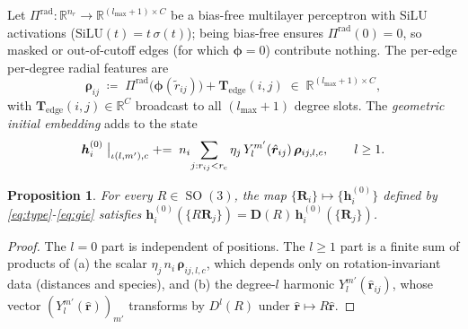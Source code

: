 \documentclass[11pt,a4paper]{article}
\DeclareMathOperator{\SO}{SO}
\newcommand{\R}{\mathbb{R}}
\newcommand{\bR}{\bm{R}}
\newcommand{\brh}{\hat{\bm{r}}}
\newcommand{\bh}{\bm{h}}
\newcommand{\Te}{\bm{T}}
\newcommand{\bD}{\bm{D}}
\newcommand{\bphi}{\bm{\phi}}
\newcommand{\brho}{\bm{\rho}}
\newcommand{\rcut}{r_{\mathrm{c}}}
\newcommand{\lmax}{l_{\max}}
\newcommand{\rtilde}{\widetilde{r}}
\theoremstyle{plain}
\newtheorem{proposition}[theorem]{Proposition}
\theoremstyle{definition}
\theoremstyle{remark}
\begin{document}
    Let $\Pi^{\mathrm{rad}}:\R^{n_r}\to\R^{(\lmax+1)\times C}$ be a bias-free
    multilayer perceptron with SiLU activations ($\mathrm{SiLU}(t)=t\,\sigma(t)$);
    being bias-free ensures $\Pi^{\mathrm{rad}}(0)=0$, so masked or out-of-cutoff
    edges (for which $\bphi=0$) contribute nothing. The per-edge per-degree radial
    features are
    \begin{equation}\label{eq:rho-edge}
        \brho_{ij} \;\coloneqq\; \Pi^{\mathrm{rad}}\!\bigl(\bphi(\rtilde_{ij})\bigr)+\Te_{\mathrm{edge}}(i,j) \;\in\;\R^{(\lmax+1)\times C},
    \end{equation}
    with $\Te_{\mathrm{edge}}(i,j)\in\R^{C}$ broadcast to all $(\lmax+1)$ degree slots.
    The \emph{geometric initial embedding} adds to the state
    \begin{equation}\label{eq:gie}
        \bh_i^{(0)}\bigm|_{\iota(l,m'),c} \;\mathrel{+}=\; n_i\!\sum_{j:r_{ij}<\rcut}\eta_j\,Y_l^{m'}(\brh_{ij})\,\brho_{ij,l,c},\qquad l\geq 1.
    \end{equation}

    \begin{proposition}\label{prop:gie-eq}
    For every $R\in\SO(3)$, the map $\{\bR_i\}\mapsto\{\bh_i^{(0)}\}$ defined by \eqref{eq:type}-\eqref{eq:gie} satisfies $\bh_i^{(0)}(\{R\bR_j\})=\bD(R)\,\bh_i^{(0)}(\{\bR_j\})$.
    \end{proposition}
    \begin{proof}
    The $l=0$ part is independent of positions.
    The $l\ge 1$ part is a finite sum of products of (a) the scalar $\eta_j\,n_i\,\brho_{ij,l,c}$, which depends only on rotation-invariant data (distances and species), and (b) the degree-$l$ harmonic $Y_l^{m'}(\brh_{ij})$, whose vector $(Y_l^{m'}(\brh))_{m'}$ transforms by $D^l(R)$ under $\brh\mapsto R\brh$.
    \end{proof}
\end{document}
